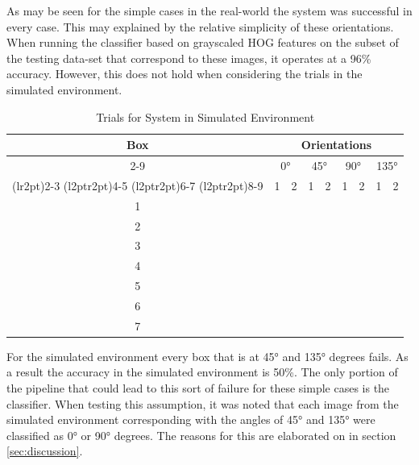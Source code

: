\documentclass[letterpaper, 10 pt, conference]{conf/ieeeconf}  %
\newcommand{\cmark}{\ding{51}}%
\newcommand{\xmark}{\ding{55}}%
\begin{document}
As may be seen for the simple cases in the real-world the system was successful
in every case. This may explained by the relative simplicity of these
orientations. When running the classifier based on grayscaled HOG features on
the subset of the testing data-set that correspond to these images, it operates
at a 96\% accuracy. However, this does not hold when considering the trials in
the simulated environment.

\begin{table}[H]
  \centering
  \begin{tabular}{c c c c c c c c c}
    \toprule
    \multirow{4}{*}[-0.5\dimexpr \aboverulesep + \belowrulesep + \cmidrulewidth]{Box} & \multicolumn{8}{c}{Orientations}\\
    \cmidrule(rl){2-9}
        & \multicolumn{2}{c}{\ang{0}} & \multicolumn{2}{c}{\ang{45}} & \multicolumn{2}{c}{\ang{90}} & \multicolumn{2}{c}{\ang{135}} \\
    \cmidrule(lr{2pt}){2-3}
    \cmidrule(l{2pt}r{2pt}){4-5}
    \cmidrule(l{2pt}r{2pt}){6-7}
    \cmidrule(l{2pt}r{2pt}){8-9}
        & 1      & 2      & 1      & 2      &  1     & 2      &  1     &  2    \\
    \midrule
    1 & \cmark & \cmark & \xmark & \xmark & \cmark & \cmark & \xmark & \xmark \\
    2 & \cmark & \cmark & \xmark & \xmark & \cmark & \cmark & \xmark & \xmark \\
    3 & \cmark & \cmark & \xmark & \xmark & \cmark & \cmark & \xmark & \xmark \\
    4 & \cmark & \cmark & \xmark & \xmark & \cmark & \cmark & \xmark & \xmark \\
    5 & \cmark & \cmark & \xmark & \xmark & \cmark & \cmark & \xmark & \xmark \\
    6 & \cmark & \cmark & \xmark & \xmark & \cmark & \cmark & \xmark & \xmark \\
    7 & \cmark & \cmark & \xmark & \xmark & \cmark & \cmark & \xmark & \xmark \\
    \bottomrule
  \end{tabular}
  \caption{Trials for System in Simulated Environment}
  \label{tab:trials_simulated}
\end{table}

For the simulated environment every box that is at \ang{45} and \ang{135}
degrees fails. As a result the accuracy in the simulated environment is 50\%.
The only portion of the pipeline that could lead to this sort of failure for
these simple cases is the classifier. When testing this assumption, it was noted
that each image from the simulated environment corresponding with the angles of
\ang{45} and \ang{135} were classified as \ang{0} or \ang{90} degrees. The
reasons for this are elaborated on in section \ref{sec:discussion}.\\
\end{document}
